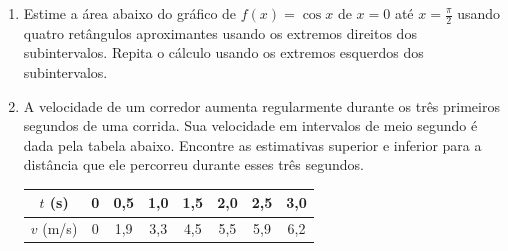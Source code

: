 \documentclass[a4paper,5pt]{amsbook}
\newcommand{\ds}{\displaystyle}
\begin{document}
\begin{enumerate}
    \vspace{0.5cm}
    \item Estime a \'area abaixo do gr\'afico de $f(x)=\cos{x}$ de $x=0$ at\'e
        $x=\ds\frac{\pi}{2}$ usando quatro ret\^angulos aproximantes usando os
        extremos direitos dos subintervalos. Repita o c\'alculo usando os
        extremos esquerdos dos subintervalos.

    \vspace{0.5cm}
    \item A velocidade de um corredor aumenta regularmente durante os tr\^es
        primeiros segundos de uma corrida. Sua velocidade em intervalos de
        meio segundo \'e dada pela tabela abaixo. Encontre as estimativas
        superior e inferior para a dist\^ancia que ele percorreu durante esses
        tr\^es segundos.

        \vspace{0.3cm}
        \begin{center}
        \begin{tabular}{|c|c|c|c|c|c|c|c|}
            \hline
            $t$ (s) & 0 & 0,5 & 1,0 & 1,5 & 2,0 & 2,5 & 3,0 \\
            \hline
            $v$ (m/s) & 0 & 1,9 & 3,3 & 4,5 & 5,5 & 5,9 & 6,2 \\
            \hline
        \end{tabular}
        \end{center}


\end{enumerate}
\end{document}
